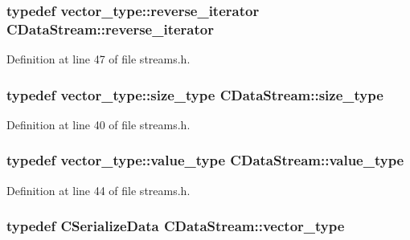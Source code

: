 \hypertarget{class_c_data_stream_a93ca1c317b7080997a20b0cf1920b39c}{}
\subsubsection[{reverse\+\_\+iterator}]{\setlength{\rightskip}{0pt plus 5cm}typedef vector\+\_\+type\+::reverse\+\_\+iterator {\bf C\+Data\+Stream\+::reverse\+\_\+iterator}}\label{class_c_data_stream_a93ca1c317b7080997a20b0cf1920b39c}


Definition at line 47 of file streams.\+h.

\hypertarget{class_c_data_stream_a79e10daad6db0f94aea1e811eb167378}{}
\subsubsection[{size\+\_\+type}]{\setlength{\rightskip}{0pt plus 5cm}typedef vector\+\_\+type\+::size\+\_\+type {\bf C\+Data\+Stream\+::size\+\_\+type}}\label{class_c_data_stream_a79e10daad6db0f94aea1e811eb167378}


Definition at line 40 of file streams.\+h.

\hypertarget{class_c_data_stream_a5572ddd57b7355f87781b89087dd18e0}{}
\subsubsection[{value\+\_\+type}]{\setlength{\rightskip}{0pt plus 5cm}typedef vector\+\_\+type\+::value\+\_\+type {\bf C\+Data\+Stream\+::value\+\_\+type}}\label{class_c_data_stream_a5572ddd57b7355f87781b89087dd18e0}


Definition at line 44 of file streams.\+h.

\hypertarget{class_c_data_stream_a5e86187632a0d6cea39f3ea525427e27}{}
\subsubsection[{vector\+\_\+type}]{\setlength{\rightskip}{0pt plus 5cm}typedef {\bf C\+Serialize\+Data} {\bf C\+Data\+Stream\+::vector\+\_\+type}\hspace{0.3cm}{\ttfamily [protected]}}\label{class_c_data_stream_a5e86187632a0d6cea39f3ea525427e27}



